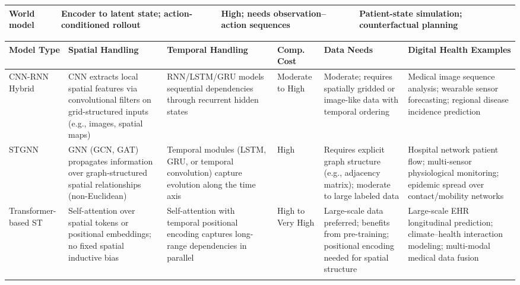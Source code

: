\documentclass[journal]{IEEEtran}
\begin{document}
\begin{table}[htbp]
\begin{tabularx}{\textwidth}{>{\raggedright\arraybackslash}p{2.4cm} >{\raggedright\arraybackslash}X >{\raggedright\arraybackslash}p{4.0cm} >{\raggedright\arraybackslash}X}
World model & Encoder to latent state; action-conditioned rollout & High; needs observation--action sequences & Patient-state simulation; counterfactual planning \\
\bottomrule
\end{tabularx}
\else
\footnotesize
\renewcommand{\arraystretch}{1.0}
\begin{tabularx}{\textwidth}{>{\raggedright\arraybackslash}p{2.2cm} >{\raggedright\arraybackslash}p{2.5cm} >{\raggedright\arraybackslash}p{2.5cm} >{\raggedright\arraybackslash}p{1.4cm} >{\raggedright\arraybackslash}p{1.8cm} >{\raggedright\arraybackslash}X}
\toprule
\textbf{Model Type} & \textbf{Spatial Handling} & \textbf{Temporal Handling} & \textbf{Comp. Cost} & \textbf{Data Needs} & \textbf{Digital Health Examples} \\
\midrule
 
CNN-RNN Hybrid
& CNN extracts local spatial features via convolutional filters on grid-structured inputs (e.g., images, spatial maps)
& RNN/LSTM/GRU models sequential dependencies through recurrent hidden states
& Moderate to High
& Moderate; requires spatially gridded or image-like data with temporal ordering
& Medical image sequence analysis; wearable sensor forecasting; regional disease incidence prediction \\
 
\addlinespace[4pt]
 
STGNN
& GNN (GCN, GAT) propagates information over graph-structured spatial relationships (non-Euclidean)
& Temporal modules (LSTM, GRU, or temporal convolution) capture evolution along the time axis
& High
& Requires explicit graph structure (e.g., adjacency matrix); moderate to large labeled data
\rowcolor{tablestripe}& Hospital network patient flow; multi-sensor physiological monitoring; epidemic spread over contact/mobility networks \\
 
\addlinespace[4pt]
 
Transformer-based ST
& Self-attention over spatial tokens or positional embeddings; no fixed spatial inductive bias
& Self-attention with temporal positional encoding captures long-range dependencies in parallel
& High to Very High
& Large-scale data preferred; benefits from pre-training; positional encoding needed for spatial structure
& Large-scale EHR longitudinal prediction; climate--health interaction modeling; multi-modal medical data fusion \\

\addlinespace[4pt]


\end{tabularx}
\end{table}
\end{document}
